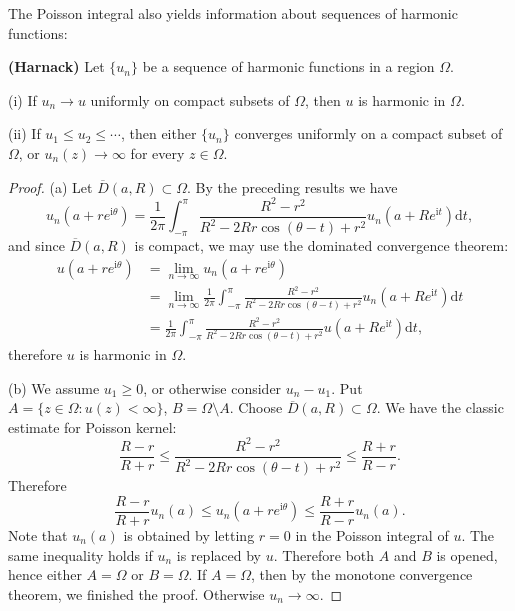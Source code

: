 The Poisson integral also yields information about sequences of harmonic functions:
\begin{theorem}{\textbf{(Harnack)}}
Let $\{u_n\}$ be a sequence of harmonic functions in a region $\Omega$.\par
(i) If $u_n\to u$ uniformly on compact subsets of $\Omega$, then $u$ is harmonic in $\Omega$.\par
(ii) If $u_1\le u_2\le\cdots$, then either $\{u_n\}$ converges uniformly on a compact subset of $\Omega$, or $u_n(z)\to\infty$ for every $z\in\Omega$.
\end{theorem}
\begin{proof}
(a) Let $\overline{D}(a,R)\subset\Omega$. By the preceding results we have 
$$
u_n\left( a+re^{\mathrm{i}\theta} \right) =\frac{1}{2\pi}\int_{-\pi}^{\pi}{\frac{R^2-r^2}{R^2-2Rr\cos \left( \theta -t \right) +r^2}u_n\left( a+Re^{\mathrm{i}t} \right) \mathrm{d}t},
$$
and since $\overline{D}(a,R)$ is compact, we may use the dominated convergence theorem: 
$$
\begin{aligned}
u\left( a+re^{\mathrm{i}\theta} \right) &=\lim_{n\rightarrow \infty} u_n\left( a+re^{\mathrm{i}\theta} \right) 
\\
&=\lim_{n\rightarrow \infty} \frac{1}{2\pi}\int_{-\pi}^{\pi}{\frac{R^2-r^2}{R^2-2Rr\cos \left( \theta -t \right) +r^2}u_n\left( a+Re^{\mathrm{i}t} \right) \mathrm{d}t}
\\
&=\frac{1}{2\pi}\int_{-\pi}^{\pi}{\frac{R^2-r^2}{R^2-2Rr\cos \left( \theta -t \right) +r^2}u\left( a+Re^{\mathrm{i}t} \right) \mathrm{d}t},
\end{aligned}
$$
therefore $u$ is harmonic in $\Omega$.\par
(b) We assume $u_1\ge 0$, or otherwise consider $u_n-u_1$. Put $A=\{z\in\Omega:u(z)<\infty\}$, $B=\Omega\setminus A$. Choose $\overline{D}(a,R)\subset\Omega$. We have the classic estimate for Poisson kernel: 
$$
\frac{R-r}{R+r}\le \frac{R^2-r^2}{R^2-2Rr\cos \left( \theta -t \right) +r^2}\le \frac{R+r}{R-r}.
$$
Therefore 
$$
\frac{R-r}{R+r}u_n\left( a \right) \le u_n\left( a+re^{\mathrm{i}\theta} \right) \le \frac{R+r}{R-r}u_n\left( a \right) .
$$
Note that $u_n(a)$ is obtained by letting $r=0$ in the Poisson integral of $u$. The same inequality holds if $u_n$ is replaced by $u$. Therefore both $A$ and $B$ is opened, hence either $A=\Omega$ or $B=\Omega$. If $A=\Omega$, then by the monotone convergence theorem, we finished the proof. Otherwise $u_n\to\infty$.
\end{proof}
